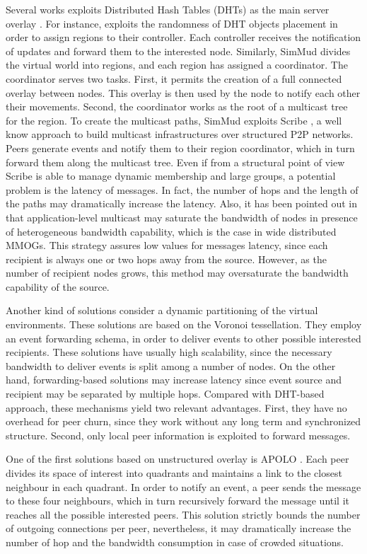 \documentclass[final,10pt,a5paper]{phdimt}
\theoremstyle{definition}
\begin{document}
Several works exploits Distributed Hash Tables (DHTs) as the main server overlay \cite{Chen,Bharambea,Knutsson2004}.
For instance, \cite{Chen} exploits the randomness of DHT objects placement in order to assign regions to their controller.
Each controller receives the notification of updates and forward them to the interested node.
Similarly, SimMud \cite{Knutsson2004} divides the virtual world into regions, and each region has assigned a coordinator.
The coordinator serves two tasks.
First, it permits the creation of a full connected overlay between nodes. 
This overlay is then used by the node to notify each other their movements.
Second, the coordinator works as the root of a multicast tree for the region. To create the multicast paths, SimMud exploits Scribe \cite{Castro2002}, a well know approach to build multicast infrastructures over structured P2P networks. Peers generate events and notify them to their region coordinator, which in turn forward them along the multicast tree.
Even if from a structural point of view Scribe is able to manage dynamic membership and large groups, a potential problem is the latency of messages. In fact, the number of hops and the length of the paths may dramatically increase the latency. 
Also, it has been pointed out in \cite{Bharambe2005} that application-level multicast may saturate the bandwidth of nodes in presence of heterogeneous bandwidth capability, which is the case in wide distributed MMOGs.
This strategy assures low values for messages latency, since each recipient is always one or two hops away from the source. However, as the number of recipient nodes grows, this method may oversaturate the bandwidth capability of the source. 

Another kind of solutions consider a dynamic partitioning of the virtual environments.
These solutions are based on the Voronoi tessellation.
They employ an event forwarding schema, in order to deliver events to other possible interested recipients.
These solutions have usually high scalability, since the necessary bandwidth to deliver events is split among a number of nodes. On the other hand, forwarding-based solutions may increase latency since event source and recipient may be separated by multiple hops.
Compared with DHT-based approach, these mechanisms yield two relevant advantages. First, they have no overhead for peer churn, since they work without any long term and synchronized structure. Second, only local peer information is exploited to forward messages.

One of the first solutions based on unstructured overlay is APOLO \cite{lee2006apolo}. Each peer divides its space of interest into quadrants and maintains a link to the closest neighbour in each quadrant. In order to notify an event, a peer sends the message to these four neighbours, which in turn recursively forward the message until it reaches all the possible interested peers. This solution strictly bounds the number of outgoing connections per peer, nevertheless, it may dramatically increase the number of hop and the bandwidth consumption in case of crowded situations.
\end{document}
